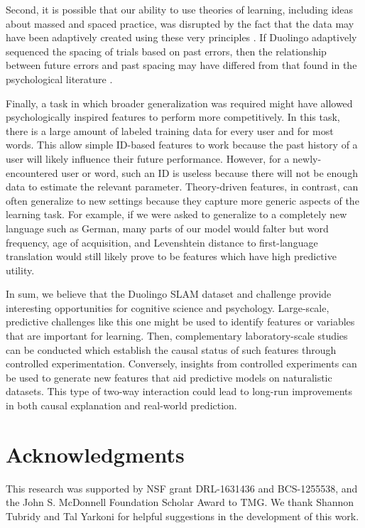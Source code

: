 \documentclass[11pt,a4paper]{article}
\begin{document}
Second, it is possible that our ability to use theories of learning, including
ideas about massed and spaced practice, was disrupted by the fact that the data
may have been adaptively created using these very principles
\cite{settles2016trainable}. If Duolingo adaptively sequenced the spacing of
trials based on past errors, then the relationship between future errors and
past spacing may have differed from that found in the psychological literature
\cite{Cepeda:2006aa}.

Finally, a task in which broader generalization was required might have
allowed psychologically inspired features to perform more competitively. In this
task, there is a large amount of labeled training data for every user and for
most words. This allow simple ID-based features to work because the past
history of a user will likely influence their future performance. However, for a
newly-encountered user or word, such an ID is useless because there will not be
enough data to estimate the relevant parameter. Theory-driven features, in
contrast, can often generalize to new settings because they capture more
generic aspects of the learning task.  For example, if we were asked to generalize to
a completely new language such as German, many parts of our model would falter
but word frequency, age of acquisition, and Levenshtein distance to
first-language translation would still likely prove to be features which
have high predictive utility.

In sum, we believe that the Duolingo SLAM dataset and challenge provide
interesting opportunities for cognitive science and psychology. 
Large-scale, predictive challenges like this one
might be used to identify features or variables that are important for learning.
Then, complementary laboratory-scale studies can be conducted which
establish the causal status of such features through controlled experimentation.
Conversely, insights from controlled experiments can be used to generate
new features that aid predictive models on naturalistic datasets. This type of
two-way interaction could lead to long-run improvements in both causal
explanation and real-world prediction.

\section{Acknowledgments}
This research was supported by NSF grant DRL-1631436 and BCS-1255538,
and the John S. McDonnell Foundation Scholar Award to TMG.  We thank
Shannon Tubridy and Tal Yarkoni for helpful suggestions in the development
of this work.



\end{document}
